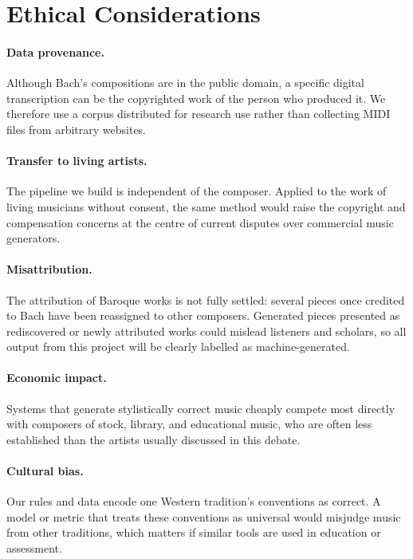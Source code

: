 \documentclass{article}
\begin{document}
\section{Ethical Considerations}

\paragraph{Data provenance.} Although Bach's compositions are in the public domain, a specific digital transcription can be the copyrighted work of the person who produced it. We therefore use a corpus distributed for research use rather than collecting MIDI files from arbitrary websites.

\paragraph{Transfer to living artists.} The pipeline we build is independent of the composer. Applied to the work of living musicians without consent, the same method would raise the copyright and compensation concerns at the centre of current disputes over commercial music generators.

\paragraph{Misattribution.} The attribution of Baroque works is not fully settled: several pieces once credited to Bach have been reassigned to other composers. Generated pieces presented as rediscovered or newly attributed works could mislead listeners and scholars, so all output from this project will be clearly labelled as machine-generated.

\paragraph{Economic impact.} Systems that generate stylistically correct music cheaply compete most directly with composers of stock, library, and educational music, who are often less established than the artists usually discussed in this debate.

\paragraph{Cultural bias.} Our rules and data encode one Western tradition's conventions as correct. A model or metric that treats these conventions as universal would misjudge music from other traditions, which matters if similar tools are used in education or assessment.
\end{document}
